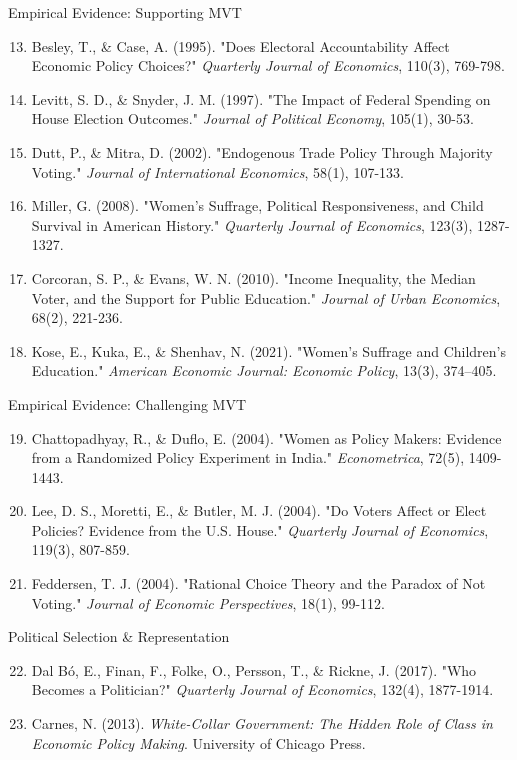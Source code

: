 \documentclass[10pt]{beamer}
\begin{document}
\begin{frame}{Empirical Evidence: Supporting MVT}
\footnotesize
\begin{enumerate}
\setcounter{enumi}{12}
\item Besley, T., \& Case, A. (1995). "Does Electoral Accountability Affect Economic Policy Choices?" \emph{Quarterly Journal of Economics}, 110(3), 769-798.
\item Levitt, S. D., \& Snyder, J. M. (1997). "The Impact of Federal Spending on House Election Outcomes." \emph{Journal of Political Economy}, 105(1), 30-53.
\item Dutt, P., \& Mitra, D. (2002). "Endogenous Trade Policy Through Majority Voting." \emph{Journal of International Economics}, 58(1), 107-133.
\item Miller, G. (2008). "Women's Suffrage, Political Responsiveness, and Child Survival in American History." \emph{Quarterly Journal of Economics}, 123(3), 1287-1327.
\item Corcoran, S. P., \& Evans, W. N. (2010). "Income Inequality, the Median Voter, and the Support for Public Education." \emph{Journal of Urban Economics}, 68(2), 221-236.
\item Kose, E., Kuka, E., \& Shenhav, N. (2021). "Women's Suffrage and Children's Education." \emph{American Economic Journal: Economic Policy}, 13(3), 374--405.
\end{enumerate}
\end{frame}

\begin{frame}{Empirical Evidence: Challenging MVT}
\footnotesize
\begin{enumerate}
\setcounter{enumi}{18}
\item Chattopadhyay, R., \& Duflo, E. (2004). "Women as Policy Makers: Evidence from a Randomized Policy Experiment in India." \emph{Econometrica}, 72(5), 1409-1443.
\item Lee, D. S., Moretti, E., \& Butler, M. J. (2004). "Do Voters Affect or Elect Policies? Evidence from the U.S. House." \emph{Quarterly Journal of Economics}, 119(3), 807-859.
\item Feddersen, T. J. (2004). "Rational Choice Theory and the Paradox of Not Voting." \emph{Journal of Economic Perspectives}, 18(1), 99-112.
\end{enumerate}
\end{frame}

\begin{frame}{Political Selection \& Representation}
\footnotesize
\begin{enumerate}
\setcounter{enumi}{21}
\item Dal Bó, E., Finan, F., Folke, O., Persson, T., \& Rickne, J. (2017). "Who Becomes a Politician?" \emph{Quarterly Journal of Economics}, 132(4), 1877-1914.
\item Carnes, N. (2013). \emph{White-Collar Government: The Hidden Role of Class in Economic Policy Making}. University of Chicago Press.
\end{enumerate}
\end{frame}
\end{document}
